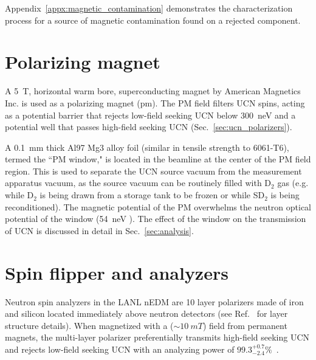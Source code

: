 Appendix~\ref{appx:magnetic_contamination} demonstrates the characterization process for a source of magnetic contamination found on a rejected component.


\section{Polarizing magnet}\label{sec:PM_description}


A \qty{5}{\tesla}, horizontal warm bore, superconducting magnet by American Magnetics Inc. is used as a polarizing magnet (\acrshort*{pm}). The PM field filters UCN spins, acting as a potential barrier that rejects low-field seeking UCN below \qty{300}{\nano\eV} and a potential well that passes high-field seeking UCN (Sec.~\ref{sec:ucn_polarizers}). 

A \qty{0.1}{\milli\meter} thick Al97 Mg3 alloy foil (similar in tensile strength to 6061-T6), termed the ``PM window," is located in the beamline at the center of the PM field region. This is used to separate the UCN source vacuum from the measurement apparatus vacuum, as the source vacuum can be routinely filled with D$_2$ gas (e.g. while D$_2$ is being drawn from a storage tank to be frozen or while SD$_2$ is being reconditioned). The magnetic potential of the PM overwhelms the neutron optical potential of the window (\qty{54}{\nano\eV} \cite{golubUCN}). The effect of the window on the transmission of UCN is discussed in detail in Sec.~\ref{sec:analysis}.


\section{Spin flipper and analyzers}\label{sec:spin_flipper_analyzer}


Neutron spin analyzers in the LANL nEDM are 10 layer polarizers made of iron and silicon located immediately above neutron detectors (see Ref.~\cite{ThorstenThesis} for layer structure details). When magnetized with a ($\sim \qty{10}{mT}$) field from permanent magnets, the multi-layer polarizer preferentially transmits high-field seeking UCN and rejects low-field seeking UCN with an analyzing power of $99.3^{+0.7}_{-2.4}\%$~\cite{ThorstenThesis}.

